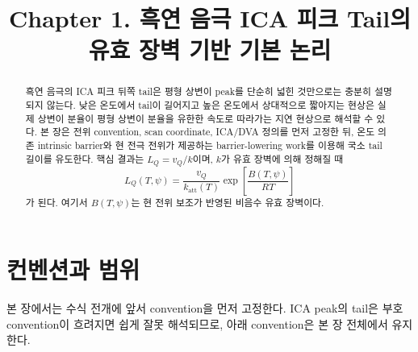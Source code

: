 \documentclass[11pt]{article}
\title{Chapter 1. 흑연 음극 ICA 피크 Tail의 유효 장벽 기반 기본 논리}
\author{}
\date{}
\newcommand{\att}{\mathrm{att}}
\begin{document}
\maketitle

\begin{abstract}
흑연 음극의 ICA 피크 뒤쪽 tail은 평형 상변이 peak를 단순히 넓힌 것만으로는 충분히 설명되지 않는다. 낮은 온도에서 tail이 길어지고 높은 온도에서 상대적으로 짧아지는 현상은 실제 상변이 분율이 평형 상변이 분율을 유한한 속도로 따라가는 지연 현상으로 해석할 수 있다. 본 장은 전위 convention, scan coordinate, ICA/DVA 정의를 먼저 고정한 뒤, 온도 의존 intrinsic barrier와 현 전극 전위가 제공하는 barrier-lowering work를 이용해 국소 tail 길이를 유도한다. 핵심 결과는 \(L_Q=v_Q/k\)이며, \(k\)가 유효 장벽에 의해 정해질 때
\[
L_Q(T,\psi)
=
\frac{v_Q}{k_{\att}(T)}
\exp\!\left[\frac{B(T,\psi)}{RT}\right]
\]
가 된다. 여기서 \(B(T,\psi)\)는 현 전위 보조가 반영된 비음수 유효 장벽이다.
\end{abstract}

\section{컨벤션과 범위}

본 장에서는 수식 전개에 앞서 convention을 먼저 고정한다. ICA peak의 tail은 부호 convention이 흐려지면 쉽게 잘못 해석되므로, 아래 convention은 본 장 전체에서 유지한다.
\end{document}
